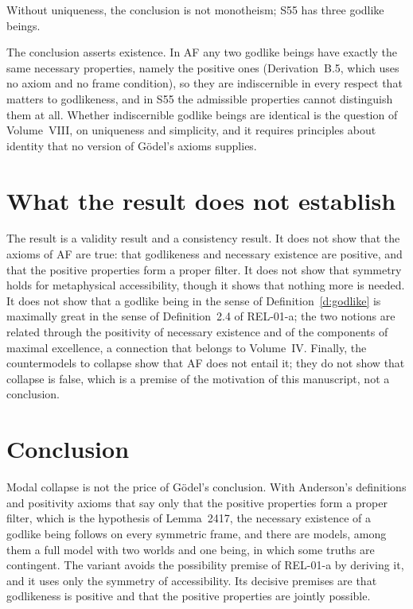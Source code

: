 \documentclass{situationist-preprint}
\begin{document}
\begin{objection}
Without uniqueness, the conclusion is not monotheism; S55 has three godlike beings.
\end{objection}

\begin{reply}
The conclusion asserts existence. In AF any two godlike beings have exactly the same necessary properties, namely the positive ones (Derivation~B.5, which uses no axiom and no frame condition), so they are indiscernible in every respect that matters to godlikeness, and in S55 the admissible properties cannot distinguish them at all. Whether indiscernible godlike beings are identical is the question of Volume~VIII, on uniqueness and simplicity, and it requires principles about identity that no version of Gödel's axioms supplies.
\end{reply}

\section{What the result does not establish}\label{s:not}

The result is a validity result and a consistency result. It does not show that the axioms of AF are true: that godlikeness and necessary existence are positive, and that the positive properties form a proper filter. It does not show that symmetry holds for metaphysical accessibility, though it shows that nothing more is needed. It does not show that a godlike being in the sense of Definition~\ref{d:godlike} is maximally great in the sense of Definition~2.4 of REL-01-a; the two notions are related through the positivity of necessary existence and of the components of maximal excellence, a connection that belongs to Volume~IV. Finally, the countermodels to collapse show that AF does not entail it; they do not show that collapse is false, which is a premise of the motivation of this manuscript, not a conclusion.

\section{Conclusion}

Modal collapse is not the price of Gödel's conclusion. With Anderson's definitions and positivity axioms that say only that the positive properties form a proper filter, which is the hypothesis of Lemma~2417, the necessary existence of a godlike being follows on every symmetric frame, and there are models, among them a full model with two worlds and one being, in which some truths are contingent. The variant avoids the possibility premise of REL-01-a by deriving it, and it uses only the symmetry of accessibility. Its decisive premises are that godlikeness is positive and that the positive properties are jointly possible.
\end{document}
